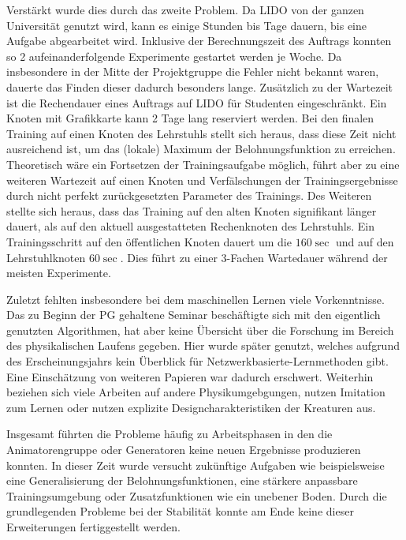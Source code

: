 Verstärkt wurde dies durch das zweite Problem. Da LIDO von der ganzen Universität genutzt wird, kann es einige Stunden bis Tage dauern, bis eine Aufgabe abgearbeitet wird. Inklusive der Berechnungszeit des Auftrags konnten so 2 aufeinanderfolgende Experimente gestartet werden je Woche. Da insbesondere in der Mitte der Projektgruppe die Fehler nicht bekannt waren, dauerte das Finden dieser dadurch besonders lange. 
Zusätzlich zu der Wartezeit ist die Rechendauer eines Auftrags auf LIDO für Studenten eingeschränkt. Ein Knoten mit Grafikkarte kann 2 Tage lang reserviert werden. Bei den finalen Training auf einen Knoten des Lehrstuhls stellt sich heraus, dass diese Zeit nicht ausreichend ist, um das (lokale) Maximum der Belohnungsfunktion zu erreichen. Theoretisch wäre ein Fortsetzen der Trainingsaufgabe möglich, führt aber zu eine weiteren Wartezeit auf einen Knoten und Verfälschungen der Trainingsergebnisse durch nicht perfekt zurückgesetzten Parameter des Trainings. 
Des Weiteren stellte sich heraus, dass das Training auf den alten Knoten signifikant länger dauert, als auf den aktuell ausgestatteten Rechenknoten des Lehrstuhls. Ein Trainingsschritt auf den öffentlichen Knoten dauert um die $160 \si{\sec}$  und auf den Lehrstuhlknoten $60 \si{\sec}$. Dies führt zu einer 3-Fachen Wartedauer während der meisten Experimente.

Zuletzt fehlten insbesondere bei dem maschinellen Lernen viele Vorkenntnisse. Das zu Beginn der PG gehaltene Seminar beschäftigte sich mit den eigentlich genutzten Algorithmen, hat aber keine Übersicht über die Forschung im Bereich des physikalischen Laufens gegeben. Hier wurde später \cite{Geijtenbeek2012} genutzt, welches aufgrund des Erscheinungsjahrs kein Überblick für Netzwerkbasierte-Lernmethoden gibt. Eine Einschätzung von weiteren Papieren war dadurch erschwert. Weiterhin beziehen sich viele Arbeiten auf andere Physikumgebgungen, nutzen Imitation zum Lernen oder nutzen explizite Designcharakteristiken der Kreaturen aus\cite{Mourot2022}.

Insgesamt führten die Probleme häufig zu Arbeitsphasen in den die Animatorengruppe oder Generatoren keine neuen Ergebnisse produzieren konnten. In dieser Zeit wurde versucht zukünftige Aufgaben wie beispielsweise eine Generalisierung der Belohnungsfunktionen, eine stärkere anpassbare Trainingsumgebung oder Zusatzfunktionen wie ein unebener Boden. Durch die grundlegenden Probleme bei der Stabilität konnte am Ende keine dieser Erweiterungen fertiggestellt werden.